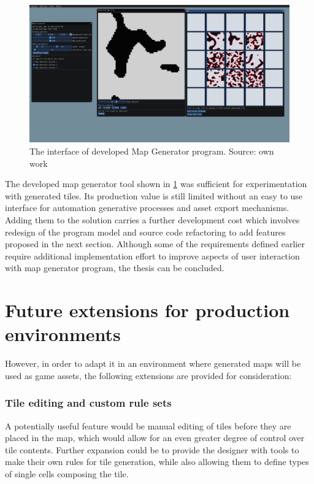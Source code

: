 \documentclass[12pt]{report}
\begin{document}
\begin{figure}[H]
	\centering
	\includegraphics[width=\linewidth]{images/interface_mapgen}
	\caption{The interface of developed Map Generator program. Source: own work}
	\label{fig:interfacemapgen}
\end{figure}

The developed map generator tool shown in \cref{fig:interfacemapgen} was sufficient for experimentation with generated tiles. Its production value is still limited without an easy to use interface for automation generative processes and asset export mechanisms. Adding them to the solution carries a further development cost which involves redesign of the program model and source code refactoring to add features proposed in the next section. Although some of the requirements defined earlier require additional implementation effort to improve aspects of user interaction with map generator program, the thesis can be concluded. 

\section{Future extensions for production environments}

However, in order to adapt it in an environment where generated maps will be used as game assets, the following extensions are provided for consideration:

\subsubsection{Tile editing and custom rule sets}

A potentially useful feature would be manual editing of tiles before they are placed in the map, which would allow for an even greater degree of control over tile contents. Further expansion could be to provide the designer with tools to make their own rules for tile generation, while also allowing them to define types of single cells composing the tile.
\end{document}
